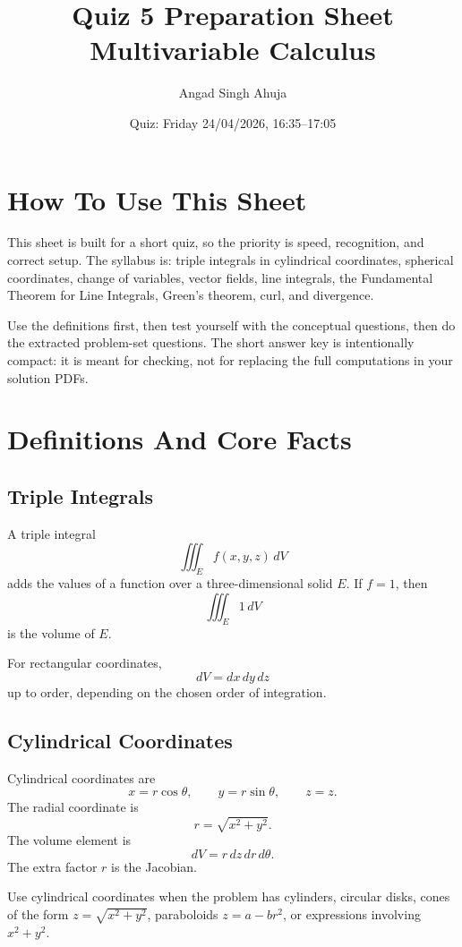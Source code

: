 \documentclass[11pt]{article}
\title{Quiz 5 Preparation Sheet\\Multivariable Calculus}
\author{Angad Singh Ahuja}
\date{Quiz: Friday 24/04/2026, 16:35--17:05}
\begin{document}
\maketitle

\tableofcontents
\newpage

\section*{How To Use This Sheet}

This sheet is built for a short quiz, so the priority is speed, recognition, and correct setup. The syllabus is: triple integrals in cylindrical coordinates, spherical coordinates, change of variables, vector fields, line integrals, the Fundamental Theorem for Line Integrals, Green's theorem, curl, and divergence.

Use the definitions first, then test yourself with the conceptual questions, then do the extracted problem-set questions. The short answer key is intentionally compact: it is meant for checking, not for replacing the full computations in your solution PDFs.

\section{Definitions And Core Facts}

\subsection{Triple Integrals}

A triple integral
\[
\iiint_E f(x,y,z)\,dV
\]
adds the values of a function over a three-dimensional solid $E$. If $f=1$, then
\[
\iiint_E 1\,dV
\]
is the volume of $E$.

For rectangular coordinates,
\[
dV=dx\,dy\,dz
\]
up to order, depending on the chosen order of integration.

\subsection{Cylindrical Coordinates}

Cylindrical coordinates are
\[
x=r\cos\theta,\qquad y=r\sin\theta,\qquad z=z.
\]
The radial coordinate is
\[
r=\sqrt{x^2+y^2}.
\]
The volume element is
\[
dV=r\,dz\,dr\,d\theta.
\]
The extra factor $r$ is the Jacobian.

Use cylindrical coordinates when the problem has cylinders, circular disks, cones of the form $z=\sqrt{x^2+y^2}$, paraboloids $z=a-br^2$, or expressions involving $x^2+y^2$.
\end{document}
